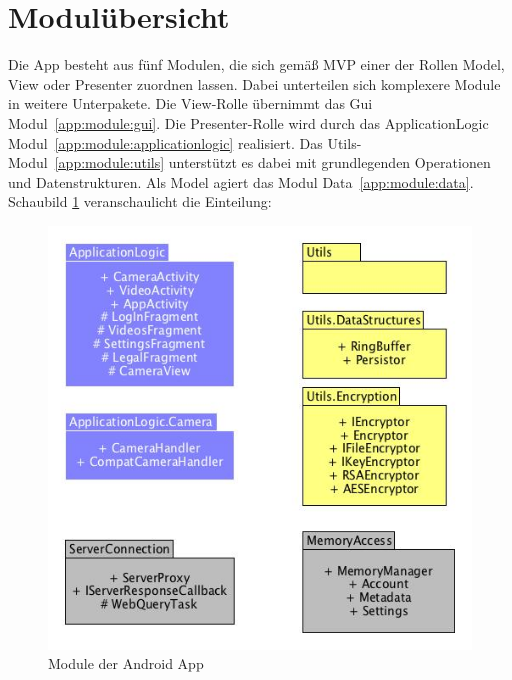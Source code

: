 \section{Modulübersicht}
Die App besteht aus fünf Modulen, die sich gemäß MVP einer der Rollen Model, View oder Presenter zuordnen lassen. Dabei unterteilen sich komplexere Module in weitere Unterpakete. Die View-Rolle übernimmt das Gui Modul~\eqref{app:module:gui}. Die Presenter-Rolle wird durch das ApplicationLogic Modul~\eqref{app:module:applicationlogic} realisiert. Das Utils-Modul~\eqref{app:module:utils} unterstützt es dabei mit grundlegenden Operationen und Datenstrukturen. Als Model agiert das Modul Data~\eqref{app:module:data}. Schaubild \ref{fig:modules_overview} veranschaulicht die Einteilung:
\begin{figure}[ht]
	\centering
\includegraphics[width=1\textwidth]{./resources/Diagramme/App/modules_overview.jpg}
\caption{Module der Android App}
	\label{fig:modules_overview}
\end{figure}




